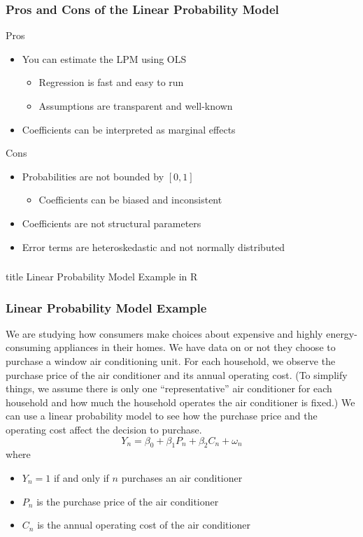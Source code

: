\documentclass{beamer}
\begin{document}
\begin{frame}\frametitle{Pros and Cons of the Linear Probability Model}
    Pros
    \begin{itemize}
    	\item You can estimate the LPM using OLS
    	\begin{itemize}
    		\item Regression is fast and easy to run
    		\item Assumptions are transparent and well-known
    	\end{itemize}
    	\item Coefficients can be interpreted as marginal effects
    \end{itemize}
    \vspace{3ex}
    Cons
    \begin{itemize}
    	\item Probabilities are not bounded by $[0, 1]$
    	\begin{itemize}
    		\item Coefficients can be biased and inconsistent
    	\end{itemize}
    	\item Coefficients are not structural parameters
    	\item Error terms are heteroskedastic and not normally distributed
    \end{itemize}
\end{frame}

\begin{frame}\frametitle{}
    \vfill
    \centering
    \begin{beamercolorbox}[center]{title}
        \Large Linear Probability Model Example in R
    \end{beamercolorbox}
    \vfill
\end{frame}

\begin{frame}\frametitle{Linear Probability Model Example}
    We are studying how consumers make choices about expensive and highly energy-consuming appliances in their homes. We have data on  or not they choose to purchase a window air conditioning unit. For each household, we observe the purchase price of the air conditioner and its annual operating cost. (To simplify things, we assume there is only one ``representative'' air conditioner for each household and how much the household operates the air conditioner is fixed.) We can use a linear probability model to see how the purchase price and the operating cost affect the decision to purchase.
    $$Y_n = \beta_0 + \beta_1 P_n + \beta_2 C_n + \omega_n$$
    where
    \begin{itemize}
    	\item $Y_n = 1$ if and only if $n$ purchases an air conditioner
    	\item $P_n$ is the purchase price of the air conditioner
    	\item $C_n$ is the annual operating cost of the air conditioner
    \end{itemize}
\end{frame}
\end{document}
